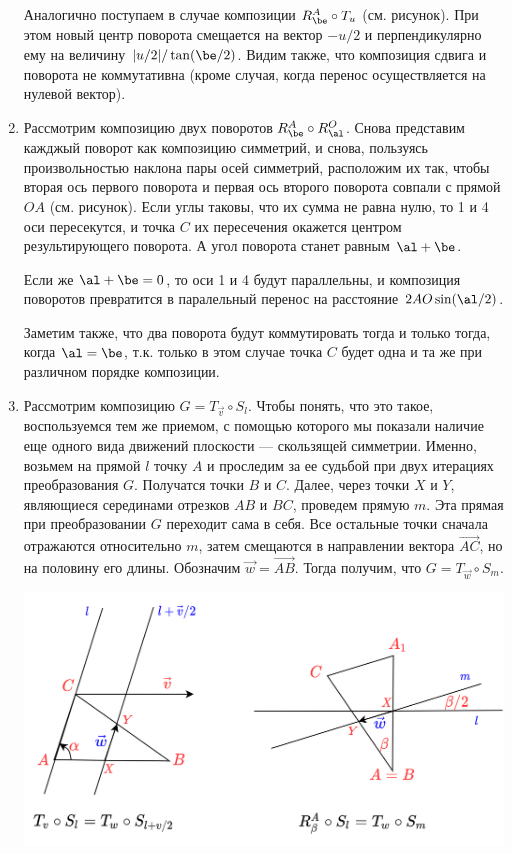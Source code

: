 \begin{enumerate}
Аналогично поступаем в случае композиции $R_\be^A\circ T_u$ (см. рисунок). При этом новый центр поворота смещается на вектор $-u/2$ и перпендикулярно ему на величину $|u/2|/\tan(\be/2)$. Видим также, что композиция сдвига и поворота не коммутативна (кроме случая, когда перенос осуществляется на нулевой вектор).

\item Рассмотрим композицию двух поворотов $R_\be^A\circ R_\al^O$. Снова представим кажджый поворот как композицию симметрий, и снова, пользуясь произвольностью наклона пары осей симметрий, расположим их так, чтобы вторая ось первого поворота и первая ось второго поворота совпали с прямой $OA$ (см. рисунок). Если углы таковы, что их сумма не равна нулю, то 1 и 4 оси пересекутся, и точка $C$ их пересечения окажется центром результирующего поворота. А угол поворота станет равным $\al+\be$.

Если же $\al+\be=0$, то оси 1 и 4 будут параллельны, и композиция поворотов превратится в паралельный перенос на расстояние $2AO\sin(\al/2)$.

Заметим также, что два поворота будут коммутировать тогда и только тогда, когда $\al=\be$, т.к. только в этом случае точка $C$ будет одна и та же при различном порядке композиции.



\item Рассмотрим композицию $G=T_{\vec v}\circ S_l$. Чтобы понять, что это такое, воспользуемся тем же приемом, с помощью которого мы показали наличие еще одного вида движений плоскости --- скользящей симметрии. Именно, возьмем на прямой $l$ точку $A$ и проследим за ее судьбой при двух итерациях преобразования $G$. Получатся точки $B$ и $C$. Далее, через точки $X$ и $Y$, являющиеся серединами отрезков $AB$ и $BC$, проведем прямую $m$. Эта прямая при преобразовании $G$ переходит сама в себя. Все остальные точки сначала отражаются относительно $m$, затем смещаются в направлении вектора $\vec{AC}$, но на половину его длины. Обозначим $\vec w=\vec{AB}$. Тогда получим, что $G=T_{\vec w}\circ S_m$.

\begin{center}
\includegraphics[scale=0.3]{slides.png}
\end{center}


\end{enumerate}
